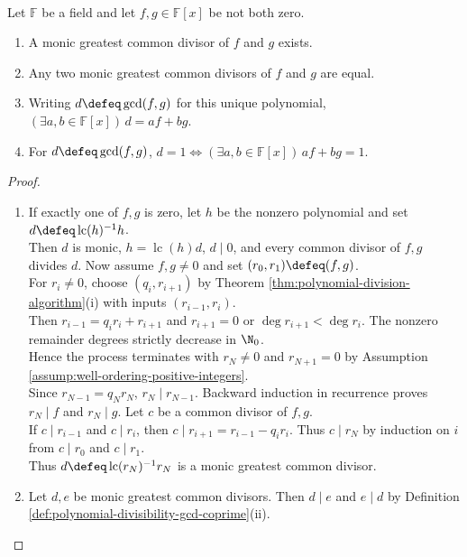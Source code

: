 \begin{theorem} \label{thm:polynomial-gcd-bezout} \\
Let $\mathbb{F}$ be a field and let $f,g\in\mathbb{F}[x]$ be not both zero.
\begin{enumerate}[label=(\roman*)]
\setlength{\itemsep}{0pt}
\item A monic greatest common divisor of $f$ and $g$ exists.
\item Any two monic greatest common divisors of $f$ and $g$ are equal.
\item Writing $d\defeq\gcd(f,g)$ for this unique polynomial, $(\exists a,b\in\mathbb{F}[x])\,d=af+bg$.
\item For $d\defeq\gcd(f,g)$, $d=1\Longleftrightarrow(\exists a,b\in\mathbb{F}[x])\,af+bg=1$.
\end{enumerate}
\begin{proof}
\begin{enumerate}[label=(\roman*)]
\setlength{\itemsep}{0pt}
\item[$(i)$] If exactly one of $f,g$ is zero, let $h$ be the nonzero polynomial and set $d\defeq\operatorname{lc}(h)^{-1}h$.\\
Then $d$ is monic, $h=\operatorname{lc}(h)d$, $d\mid0$, and every common divisor of $f,g$ divides $d$. Now assume $f,g\neq0$ and set $(r_0,r_1)\defeq(f,g)$.\\
For $r_i\neq0$, choose $(q_i,r_{i+1})$ by Theorem \ref{thm:polynomial-division-algorithm}(i) with inputs $(r_{i-1},r_i)$.\\
Then $r_{i-1}=q_ir_i+r_{i+1}$ and $r_{i+1}=0$ or $\deg r_{i+1}<\deg r_i$. The nonzero remainder degrees strictly decrease in $\N_0$.\\
Hence the process terminates with $r_N\neq0$ and $r_{N+1}=0$ by Assumption \ref{assump:well-ordering-positive-integers}.\\
Since $r_{N-1}=q_Nr_N$, $r_N\mid r_{N-1}$. Backward induction in recurrence proves $r_N\mid f$ and $r_N\mid g$. Let $c$ be a common divisor of $f,g$.\\
If $c\mid r_{i-1}$ and $c\mid r_i$, then $c\mid r_{i+1}=r_{i-1}-q_ir_i$. Thus $c\mid r_N$ by induction on $i$ from $c\mid r_0$ and $c\mid r_1$.\\
Thus $d\defeq\operatorname{lc}(r_N)^{-1}r_N$ is a monic greatest common divisor.
\item[$(ii)$] Let $d,e$ be monic greatest common divisors. Then $d\mid e$ and $e\mid d$ by Definition \ref{def:polynomial-divisibility-gcd-coprime}(ii).\\

\end{enumerate}
\end{proof}
\end{theorem}
